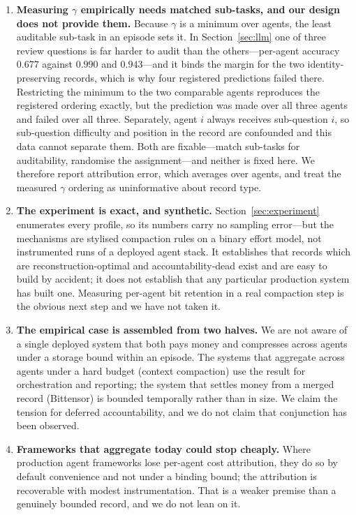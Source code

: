 \begin{enumerate}
\item \textbf{Measuring $\gamma$ empirically needs matched sub-tasks, and our
      design does not provide them.} Because $\gamma$ is a minimum over agents,
      the least auditable sub-task in an episode sets it. In
      Section~\ref{sec:llm} one of three review questions is far harder to audit
      than the others---per-agent accuracy $0.677$ against $0.990$ and
      $0.943$---and it binds the margin for the two identity-preserving records,
      which is why four registered predictions failed there. Restricting the
      minimum to the two comparable agents reproduces the registered ordering
      exactly, but the prediction was made over all three agents and failed over
      all three. Separately, agent $i$ always receives sub-question $i$, so
      sub-question difficulty and position in the record are confounded and this
      data cannot separate them. Both are fixable---match sub-tasks for
      auditability, randomise the assignment---and neither is fixed here. We
      therefore report attribution error, which averages over agents, and treat
      the measured $\gamma$ ordering as uninformative about record type.

\item \textbf{The experiment is exact, and synthetic.}
      Section~\ref{sec:experiment} enumerates every profile, so its numbers carry
      no sampling error---but the mechanisms are stylised compaction rules on a
      binary effort model, not instrumented runs of a deployed agent stack. It
      establishes that records which are reconstruction-optimal and
      accountability-dead exist and are easy to build by accident; it does not
      establish that any particular production system has built one. Measuring
      per-agent bit retention in a real compaction step is the obvious next step
      and we have not taken it.

\item \textbf{The empirical case is assembled from two halves.} We are not aware
      of a single deployed system that both pays money and compresses across
      agents under a storage bound within an episode. The systems that aggregate
      across agents under a hard budget (context compaction) use the result for
      orchestration and reporting; the system that settles money from a merged
      record (Bittensor) is bounded temporally rather than in size. We claim the
      tension for deferred accountability, and we do not claim that conjunction
      has been observed.

\item \textbf{Frameworks that aggregate today could stop cheaply.} Where
      production agent frameworks lose per-agent cost attribution, they do so by
      default convenience and not under a binding bound; the attribution is
      recoverable with modest instrumentation. That is a weaker premise than a
      genuinely bounded record, and we do not lean on it.
\end{enumerate}


